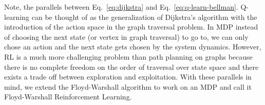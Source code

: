Note, the parallels between Eq.~\eqref{eq:dijkstra} and
Eq.~\eqref{eq:q-learn-bellman}. Q-learning can be thought of as the
generalization of Dijkstra's algorithm with the introduction of the action space in
the graph traversal problem. In MDP instead of choosing the next state (or
vertex in graph traversal) to go to, we can only chose an action and the next
state gets chosen by the system dynamics.
However, RL is a much more challenging problem than path planning on graphs
because there is no complete freedom on the order of traversal over state space
and there exists a trade off between exploration and exploitation. With these
parallels in mind, we extend the Floyd-Warshall algorithm to work on an MDP and
call it Floyd-Warshall Reinforcement Learning.


